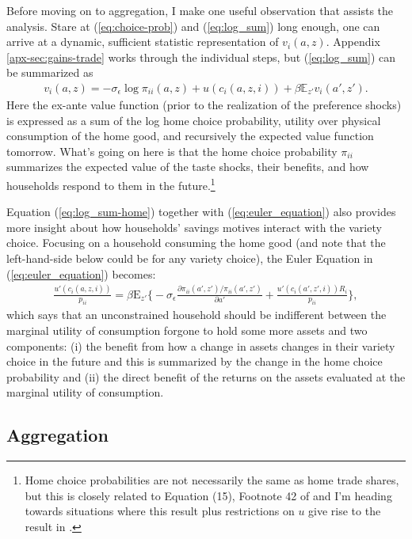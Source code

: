 \documentclass[12pt,pdftex]{article}
\begin{document}
\begin{onehalfspacing}
Before moving on to aggregation, I make one useful observation that assists the analysis. Stare at (\ref{eq:choice-prob}) and (\ref{eq:log_sum}) long enough, one can arrive at a dynamic, sufficient statistic representation of $v_i(a, z)$. Appendix \ref{apx-sec:gains-trade} works through the individual steps, but (\ref{eq:log_sum}) can be summarized as
\begin{align}
v_i(a, z) = -\sigma_{\epsilon} \log \pi_{ii}(a,z) + u(c_{i}(a,z,i)) + \beta \mathbb{E}_{z'} v_{i}(a',z').
\label{eq:log_sum-home}
\end{align}
Here the ex-ante value function (prior to the realization of the preference shocks) is expressed as a sum of the log home choice probability, utility over physical consumption of the home good, and recursively the expected value function tomorrow. What's going on here is that the home choice probability $\pi_{ii}$ summarizes the expected value of the taste shocks, their benefits, and how households respond to them in the future.\footnote{Home choice probabilities are not necessarily the same as home trade shares, but this is closely related to Equation (15), Footnote 42 of \citet{eaton2002technology} and I'm heading towards situations where this result plus restrictions on $u$ give rise to the result in \citet{arkolakis2012new}.}

Equation (\ref{eq:log_sum-home}) together with (\ref{eq:euler_equation}) also provides more insight about how households' savings motives interact with the variety choice. Focusing on a household consuming the home good (and note that the left-hand-side below could be for any variety choice), the Euler Equation in (\ref{eq:euler_equation}) becomes:
\begin{align}
\frac{u'(c_{i}(a,z,i))}{p_{ii}} = \beta \mathrm{E}_{z'} \bigg \{ -\sigma_{\epsilon} \frac{\partial \pi_{ii}(a',z') / \pi_{ii}(a',z')}{\partial a'} + \frac{u'(c_{i}(a',z',i))R_i}{p_{ii}} \bigg \},
\label{eq:euler_equation-home}
\end{align}
which says that an unconstrained household should be indifferent between the marginal utility of consumption forgone to hold some more assets and two components: (i) the benefit from how a change in assets changes in their variety choice in the future and this is summarized by the change in the home choice probability and (ii) the direct benefit of the returns on the assets evaluated at the marginal utility of consumption.

\subsection{Aggregation}


\end{onehalfspacing}
\end{document}
